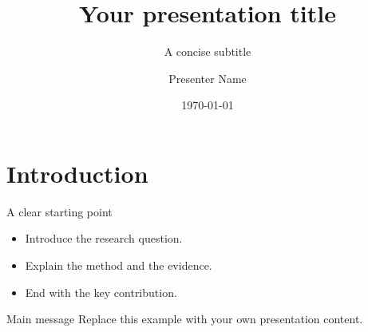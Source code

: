 \documentclass[aspectratio=169,11pt,t]{beamer}
\title[Short presentation title]{Your presentation title}
\subtitle{A concise subtitle}
\author{Presenter Name}
\institute{Department / Research Group\\City University of Hong Kong}
\date{\today}
\begin{document}
\cityutitlepage

\section{Introduction}
\begin{frame}{A clear starting point}
  \begin{itemize}
    \item Introduce the research question.
    \item Explain the method and the evidence.
    \item End with the key contribution.
  \end{itemize}
  \begin{block}{Main message}
    Replace this example with your own presentation content.
  \end{block}
\end{frame}

\end{document}

